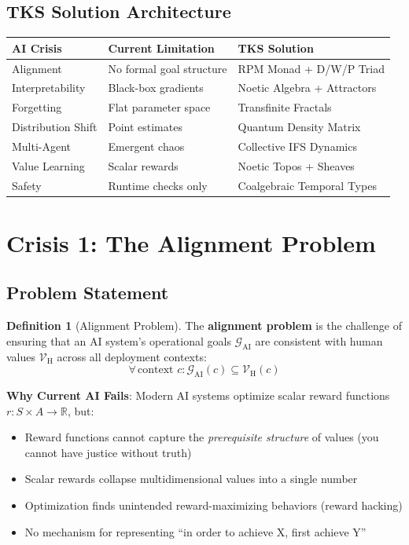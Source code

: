 \documentclass[11pt,twoside]{article}
\theoremstyle{definition}
\newtheorem{definition}{Definition}[section]
\theoremstyle{plain}
\theoremstyle{remark}
\newcommand{\AIGoal}{\mathcal{G}_{\mathrm{AI}}}
\newcommand{\HumanValue}{\mathcal{V}_{\mathrm{H}}}
\begin{document}
\subsection{TKS Solution Architecture}

\begin{center}
\begin{tabularx}{\textwidth}{|l|X|X|}
\hline
\textbf{AI Crisis} & \textbf{Current Limitation} & \textbf{TKS Solution} \\
\hline
Alignment & No formal goal structure & RPM Monad + D/W/P Triad \\
\hline
Interpretability & Black-box gradients & Noetic Algebra + Attractors \\
\hline
Forgetting & Flat parameter space & Transfinite Fractals \\
\hline
Distribution Shift & Point estimates & Quantum Density Matrix \\
\hline
Multi-Agent & Emergent chaos & Collective IFS Dynamics \\
\hline
Value Learning & Scalar rewards & Noetic Topos + Sheaves \\
\hline
Safety & Runtime checks only & Coalgebraic Temporal Types \\
\hline
\end{tabularx}
\end{center}

\section{Crisis 1: The Alignment Problem}
\label{sec:alignment}

\subsection{Problem Statement}

\begin{definition}[Alignment Problem]
\label{def:alignment-problem}
The \textbf{alignment problem} is the challenge of ensuring that an AI system's
operational goals $\AIGoal$ are consistent with human values $\HumanValue$ across
all deployment contexts:
\[
\forall\, \text{context } c : \AIGoal(c) \subseteq \HumanValue(c)
\]
\end{definition}

\textbf{Why Current AI Fails}: Modern AI systems optimize scalar reward functions
$r : S \times A \to \mathbb{R}$, but:
\begin{itemize}
  \item Reward functions cannot capture the \emph{prerequisite structure} of values
        (you cannot have justice without truth)
  \item Scalar rewards collapse multidimensional values into a single number
  \item Optimization finds unintended reward-maximizing behaviors (reward hacking)
  \item No mechanism for representing ``in order to achieve X, first achieve Y''
\end{itemize}
\end{document}
